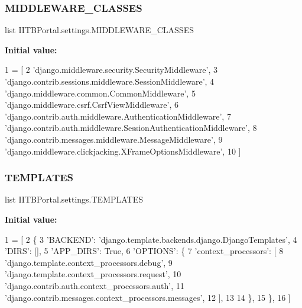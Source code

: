 \subsubsection{\texorpdfstring{M\+I\+D\+D\+L\+E\+W\+A\+R\+E\+\_\+\+C\+L\+A\+S\+S\+ES}{MIDDLEWARE\_CLASSES}}
{\footnotesize\ttfamily list I\+I\+T\+B\+Portal.\+settings.\+M\+I\+D\+D\+L\+E\+W\+A\+R\+E\+\_\+\+C\+L\+A\+S\+S\+ES}

{\bfseries Initial value\+:}
\begin{DoxyCode}
1 =  [
2     \textcolor{stringliteral}{'django.middleware.security.SecurityMiddleware'},
3     \textcolor{stringliteral}{'django.contrib.sessions.middleware.SessionMiddleware'},
4     \textcolor{stringliteral}{'django.middleware.common.CommonMiddleware'},
5     \textcolor{stringliteral}{'django.middleware.csrf.CsrfViewMiddleware'},
6     \textcolor{stringliteral}{'django.contrib.auth.middleware.AuthenticationMiddleware'},
7     \textcolor{stringliteral}{'django.contrib.auth.middleware.SessionAuthenticationMiddleware'},
8     \textcolor{stringliteral}{'django.contrib.messages.middleware.MessageMiddleware'},
9     \textcolor{stringliteral}{'django.middleware.clickjacking.XFrameOptionsMiddleware'},
10 ]
\end{DoxyCode}
\mbox{\label{namespaceIITBPortal_1_1settings_a670ae3a28c82a12f6a6fd8343b17b3d1}} 
\subsubsection{\texorpdfstring{T\+E\+M\+P\+L\+A\+T\+ES}{TEMPLATES}}
{\footnotesize\ttfamily list I\+I\+T\+B\+Portal.\+settings.\+T\+E\+M\+P\+L\+A\+T\+ES}

{\bfseries Initial value\+:}
\begin{DoxyCode}
1 =  [
2     \{
3         \textcolor{stringliteral}{'BACKEND'}: \textcolor{stringliteral}{'django.template.backends.django.DjangoTemplates'},
4         \textcolor{stringliteral}{'DIRS'}: [],
5         \textcolor{stringliteral}{'APP\_DIRS'}: \textcolor{keyword}{True},
6         \textcolor{stringliteral}{'OPTIONS'}: \{
7             \textcolor{stringliteral}{'context\_processors'}: [
8                 \textcolor{stringliteral}{'django.template.context\_processors.debug'},
9                 \textcolor{stringliteral}{'django.template.context\_processors.request'},
10                 \textcolor{stringliteral}{'django.contrib.auth.context\_processors.auth'},
11                 \textcolor{stringliteral}{'django.contrib.messages.context\_processors.messages'},
12             ],
13 
14         \},
15     \},
16 ]
\end{DoxyCode}
